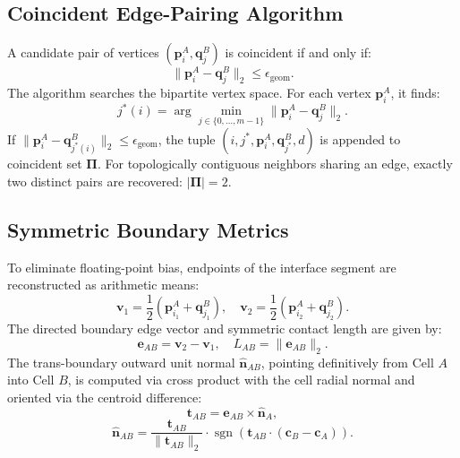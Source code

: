 \documentclass[10pt,journal,compsoc]{IEEEtran}
\begin{document}
\subsection{Coincident Edge-Pairing Algorithm}
A candidate pair of vertices $(\mathbf{p}_i^A, \mathbf{q}_j^B)$ is coincident if and only if:
\begin{equation}
\|\mathbf{p}_i^A - \mathbf{q}_j^B\|_2 \le \epsilon_{\text{geom}}.
\end{equation}
The algorithm searches the bipartite vertex space. For each vertex $\mathbf{p}_i^A$, it finds:
\begin{equation}
j^*(i) = \arg\min_{j \in \{0, \dots, m-1\}} \|\mathbf{p}_i^A - \mathbf{q}_j^B\|_2.
\end{equation}
If $\|\mathbf{p}_i^A - \mathbf{q}_{j^*(i)}^B\|_2 \le \epsilon_{\text{geom}}$, the tuple $(i, j^*, \mathbf{p}_i^A, \mathbf{q}_{j^*}^B, d)$ is appended to coincident set $\mathbf{\Pi}$. For topologically contiguous neighbors sharing an edge, exactly two distinct pairs are recovered: $|\mathbf{\Pi}| = 2$.

\subsection{Symmetric Boundary Metrics}
To eliminate floating-point bias, endpoints of the interface segment are reconstructed as arithmetic means:
\begin{equation}
\mathbf{v}_1 = \frac{1}{2}(\mathbf{p}_{i_1}^A + \mathbf{q}_{j_1}^B), \quad \mathbf{v}_2 = \frac{1}{2}(\mathbf{p}_{i_2}^A + \mathbf{q}_{j_2}^B).
\end{equation}
The directed boundary edge vector and symmetric contact length are given by:
\begin{equation}
\mathbf{e}_{AB} = \mathbf{v}_2 - \mathbf{v}_1, \quad L_{AB} = \|\mathbf{e}_{AB}\|_2.
\end{equation}
The trans-boundary outward unit normal $\hat{\mathbf{n}}_{AB}$, pointing definitively from Cell $A$ into Cell $B$, is computed via cross product with the cell radial normal and oriented via the centroid difference:
\begin{equation}
\mathbf{t}_{AB} = \mathbf{e}_{AB} \times \hat{\mathbf{n}}_A,
\end{equation}
\begin{equation}
\hat{\mathbf{n}}_{AB} = \frac{\mathbf{t}_{AB}}{\|\mathbf{t}_{AB}\|_2} \cdot \operatorname{sgn}\left( \mathbf{t}_{AB} \cdot (\mathbf{c}_B - \mathbf{c}_A) \right).
\end{equation}
\end{document}
